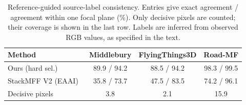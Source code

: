 \begin{table}[htbp]
\centering
\scriptsize
\caption{Reference-guided source-label consistency. Entries give exact agreement / agreement within one focal plane (\%). Only decisive pixels are counted; their coverage is shown in the last row. Labels are inferred from observed RGB values, as specified in the text.}
\label{tab:label}
\begin{tabular}{lccc}
\toprule
Method & Middlebury & FlyingThings3D & Road-MF \\
\midrule
Ours (hard sel.) & 89.9 / 94.2 & 88.5 / 94.2 & 98.3 / 99.5 \\
StackMFF V2 (EAAI)~\cite{xie2025stackmffv2} & 35.8 / 73.7 & 47.5 / 83.5 & 74.2 / 96.1 \\
\midrule
Decisive pixels & 3.8 & 2.1 & 15.9 \\
\bottomrule
\end{tabular}
\end{table}
